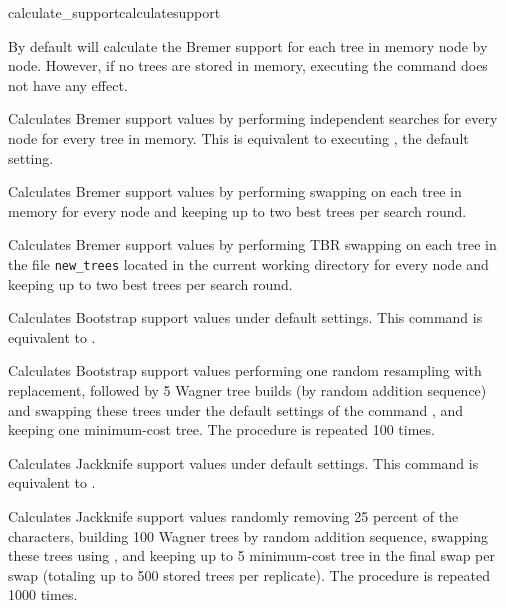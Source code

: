 \begin{command}{calculate\_support}{calculatesupport}
\begin{arguments}
\end{arguments}

{By default \poy will calculate the Bremer support for each tree
in memory node by node. However, if no trees are stored in memory,
executing the command  does not
have any effect.}

\begin{poyexamples} 

{Calculates Bremer support values by performing independent searches
for every node for every tree in memory. This is equivalent to
executing , the default setting.}

{Calculates Bremer support values by performing swapping on 
each tree in memory for every node and keeping up to two
best trees per search round.}

{Calculates Bremer support values by performing TBR swapping on 
each tree in the file \texttt{new\_trees} located in the current
working directory for every node and keeping up to two
best trees per search round.} 

{Calculates Bootstrap support values under default settings. This
command is equivalent to .}

{Calculates Bootstrap support values performing one random resampling with
replacement, followed by 5 Wagner tree builds (by random addition sequence)
and swapping these trees under the default settings of the command 
, and keeping one minimum-cost tree. The procedure
is repeated 100 times.}

{Calculates Jackknife support values under default settings. This command
is equivalent to .}   

{Calculates Jackknife support values randomly removing 25 percent
of the characters, building 100 Wagner trees by random addition
sequence, swapping these trees using , and keeping
up to 5 minimum-cost tree in the final swap per swap (totaling up
to 500 stored trees per replicate). The procedure is repeated 1000
times.}


\end{poyexamples}
\end{command}
